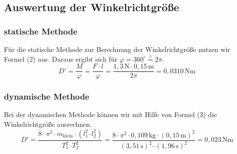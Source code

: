 \documentclass[fontsize=12pt]{scrartcl}
\newcommand*{\eqdef}{\stackrel{\scriptscriptstyle\wedge}{=}}
\begin{document}
\subsection{ Auswertung der Winkelrichtgröße}
\subsubsection{statische Methode} 
Für die statische Methode zur Berechnung der Winkelrichtgröße nutzen wir Formel (2) aus. Daraus ergibt sich für $\varphi=360^{\circ} \eqdef 2\pi$.
\begin{equation*}
 D'=\frac{M}{\varphi}= \frac{F \cdot l}{\varphi} = \frac{1,3\,\text{N} \cdot 0,15\,\text{m} }{2\pi} = 0,0310\,\text{Nm}
\end{equation*}

\subsubsection{dynamische Methode}
Bei der dynamischen Methode können wir mit Hilfe von Formel (3) die Winkelrichtgröße ausrechnen.
\begin{equation*}
D'=\frac{8 \cdot \pi^2 \cdot m_{\text{klein}} \cdot (l_1^2 – l_2^2)}{T_1^2 – T_2^2} = \frac{8 \cdot \pi^2 \cdot  0,109\,\text{kg} \cdot (0,15\,\text{m})^2}{(3,51\,\text{s})^2 – (1,96\,\text{s})^2} = 0,023\,\text{Nm}
\end{equation*}
\end{document}
